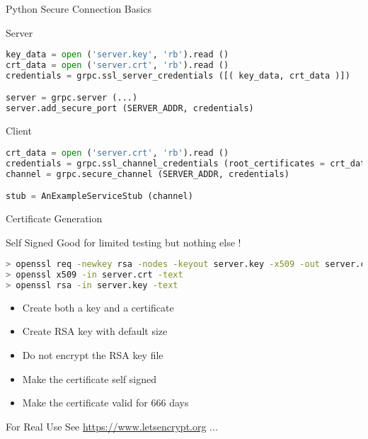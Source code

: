 \begin{frame}[fragile]{Python Secure Connection Basics}
    \begin{block}{Server}
\begin{lstlisting}[language=python,style=mini]
key_data = open ('server.key', 'rb').read ()
crt_data = open ('server.crt', 'rb').read ()
credentials = grpc.ssl_server_credentials ([( key_data, crt_data )])

server = grpc.server (...)
server.add_secure_port (SERVER_ADDR, credentials)
\end{lstlisting}
    \end{block}

    \bigskip

    \begin{block}{Client}
\begin{lstlisting}[language=python,style=mini]
crt_data = open ('server.crt', 'rb').read ()
credentials = grpc.ssl_channel_credentials (root_certificates = crt_data)
channel = grpc.secure_channel (SERVER_ADDR, credentials)

stub = AnExampleServiceStub (channel)
\end{lstlisting}
    \end{block}
\end{frame}


\begin{frame}[fragile]{Certificate Generation}
    \begin{block}{Self Signed}
        Good for limited testing but nothing else !
\begin{lstlisting}[language=bash,style=mini]
> openssl req -newkey rsa -nodes -keyout server.key -x509 -out server.crt -days 666
> openssl x509 -in server.crt -text
> openssl rsa -in server.key -text
\end{lstlisting}
        \begin{itemize}
            \item Create both a key and a certificate
            \item Create RSA key with default size
            \item Do not encrypt the RSA key file
            \item Make the certificate self signed
            \item Make the certificate valid for 666 days
        \end{itemize}
    \end{block}

    \bigskip

    \begin{block}{For Real Use}
        See \url{https://www.letsencrypt.org} ...
    \end{block}
\end{frame}


